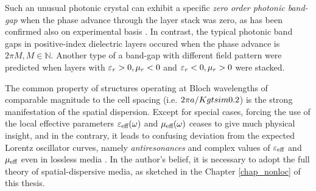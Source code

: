 Such an unusual photonic crystal can exhibit a specific \textit{zero order photonic band-gap} \cite{chan2003, panoiu2006, chen2005} when the phase advance through the layer stack was zero, as has been confirmed also on experimental basis \cite{kocaman}. In contrast, the typical photonic band gaps in positive-index dielectric layers occured when the phase advance is $2\pi M, M\in \mathbb{N}$. Another type of a band-gap with different field pattern were predicted \cite{wang2004} when layers with $\varepsilon_r>0, \mu_r<0$ and $\varepsilon_r<0, \mu_r>0$ were stacked.
%	
%

The common property of structures operating at Bloch wavelengths of comparable magnitude to the cell spacing (i.e. $2\pi a/K \\gtsim 0.2$) is the strong manifestation of the spatial dispersion. Except for special cases, forcing the use of the local effective parameters $\varepsilon_{\text{eff} }(\omega)$ and $\mu_{\text{eff} }(\omega)$ ceases to give much physical insight, and in the contrary, it leads to confusing deviation from the expected Lorentz oscillator curves, namely \textit{antiresonances} \cite{koschny2003resonant}  and complex values of $\varepsilon_{\text{eff} }$ and $\mu_{\text{eff} }$ even in lossless media \cite{chan2003}.
In the author's belief, it is necessary to adopt the full theory of spatial-dispersive media, as sketched in the Chapter \ref{chap_nonloc} of this thesis.

